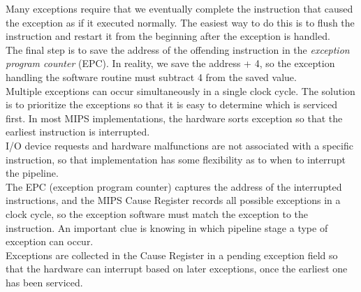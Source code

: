 \documentclass[12pt]{article}
\theoremstyle{definition}
\begin{document}
  \begin{figure}[!ht]
  \end{figure}

  Many exceptions require that we eventually complete the instruction that caused the exception as if it executed normally.
  The easiest way to do this is to flush the instruction and restart it from the beginning after the exception is handled. \\

  The final step is to save the address of the offending instruction in the \emph{exception program counter} (EPC).
  In reality, we save the address + 4, so the exception handling the software routine must subtract 4 from the saved value. \\

  Multiple exceptions can occur simultaneously in a single clock cycle.
  The solution is to prioritize the exceptions so that it is easy to determine which is serviced first.
  In most MIPS implementations, the hardware sorts exception so that the earliest instruction is interrupted. \\
  I/O device requests and hardware malfunctions are not associated with a specific instruction, so that implementation has some flexibility as to when to interrupt the pipeline. \\

  The EPC (exception program counter) captures the address of the interrupted instructions, and the MIPS Cause Register records all possible exceptions in a clock cycle, so the exception software must match the exception to the instruction.
  An important clue is knowing in which pipeline stage a type of exception can occur. \\
  Exceptions are collected in the Cause Register in a pending exception field so that the hardware can interrupt based on later exceptions, once the earliest one has been serviced.
\end{document}
